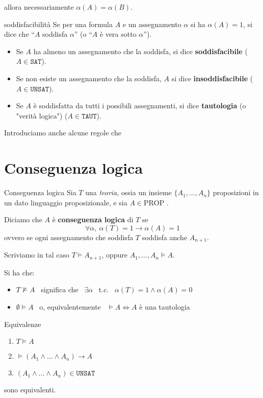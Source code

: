 \documentclass[a4paper,11pt]{report}
\begin{document}
allora necessariamente \( \alpha(A) = \alpha(B) \).

\begin{gbox}[colframe=PineGreen]{soddisfacibilità}
    Se per una formula \( A \) e un assegnamento \( \alpha \) si ha \( \alpha (A) = 1 \), si dice che ``\(A \) soddisfa \( \alpha \)'' (o ``\( A \) è vera sotto \( \alpha \)'').
    \begin{itemize}
        \item Se \( A \) ha almeno un assegnamento che la soddisfa, si dice \textbf{soddisfacibile} (\( A \in \texttt{SAT} \)).
        \item Se non esiste un assegnamento che la soddisfa, \( A \) si dice \textbf{insoddisfacibile} (\( A \in \texttt{UNSAT} \)).
        \item Se \( A \) è soddisfatta da tutti i possibili assegnamenti, si dice \textbf{tautologia} (o "verità logica") (\( A \in \texttt{TAUT} \)).
    \end{itemize}
\end{gbox}

Introduciamo anche alcune regole che 

\section{Conseguenza logica}

\begin{defbox}{Conseguenza logica}{}
    Sia \( T \) una \textit{teoria}, ossia un insieme  \( \{A_1, \dots, A_n\} \) proposizioni in un dato linguaggio proposizionale, e sia \( A \in \text{PROP}\) .

    Diciamo che \( A \) è \textbf{conseguenza logica} di \( T\) se 
    \[ \forall \alpha,\ \alpha(T)=1 \to \alpha(A)=1 \] 
    ovvero se ogni assegnamento che soddisfa \(T\) soddisfa anche \( A_{n+1} \).

    Scriviamo in tal caso \(  T \vDash A_{n+1} \), oppure \( A_1, \dots, A_n \vDash A \).
\end{defbox}

Si ha che:
\begin{itemize}
    \item \(T \not\vDash A\) \ significa che \ \( \exists \alpha \) \ t.c. \ \( \alpha(T) = 1 \land \alpha(A) = 0 \)
    \item \( \emptyset \vDash A \) \ o, equivalentemente \ \( \vDash A \iff A\) è una tautologia
\end{itemize}

\begin{lemmabox}{Equivalenze}{}
    \begin{enumerate}
        \item \( T \vDash A \)
        \item \( \vDash (A_1 \land \dots \land A_n) \to A \)
        \item \( (A_1 \land \dots \land A_n) \in \texttt{UNSAT}\) 
    \end{enumerate}

    sono equivalenti.

\end{lemmabox}
\end{document}
